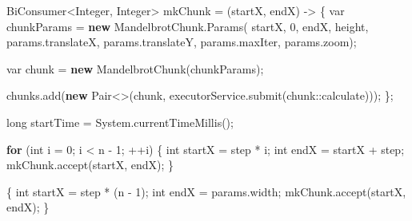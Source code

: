 \documentclass[11pt]{article}
\newenvironment{Shaded}{}{}
\newcommand{\KeywordTok}[1]{\textcolor[rgb]{0.00,0.44,0.13}{\textbf{{#1}}}}
\newcommand{\DataTypeTok}[1]{\textcolor[rgb]{0.56,0.13,0.00}{{#1}}}
\newcommand{\DecValTok}[1]{\textcolor[rgb]{0.25,0.63,0.44}{{#1}}}
\newcommand{\FunctionTok}[1]{\textcolor[rgb]{0.02,0.16,0.49}{{#1}}}
\newcommand{\NormalTok}[1]{{#1}}
\newcommand{\ControlFlowTok}[1]{\textcolor[rgb]{0.00,0.44,0.13}{\textbf{{#1}}}}
\newcommand{\OperatorTok}[1]{\textcolor[rgb]{0.40,0.40,0.40}{{#1}}}
\newcommand{\BuiltInTok}[1]{{#1}}
\begin{document}
\begin{Shaded}
\begin{Highlighting}[]
\NormalTok{        BiConsumer}\OperatorTok{\textless{}}\BuiltInTok{Integer}\OperatorTok{,} \BuiltInTok{Integer}\OperatorTok{\textgreater{}}\NormalTok{ mkChunk  }\OperatorTok{=} \OperatorTok{(}\NormalTok{startX}\OperatorTok{,}\NormalTok{ endX}\OperatorTok{)} \OperatorTok{{-}\textgreater{}} \OperatorTok{\{}
            \DataTypeTok{var}\NormalTok{ chunkParams }\OperatorTok{=} \KeywordTok{new}\NormalTok{ MandelbrotChunk}\OperatorTok{.}\FunctionTok{Params}\OperatorTok{(}
\NormalTok{                    startX}\OperatorTok{,} \DecValTok{0}\OperatorTok{,}
\NormalTok{                    endX}\OperatorTok{,}\NormalTok{ height}\OperatorTok{,}
\NormalTok{                    params}\OperatorTok{.}\FunctionTok{translateX}\OperatorTok{,}\NormalTok{ params}\OperatorTok{.}\FunctionTok{translateY}\OperatorTok{,}
\NormalTok{                    params}\OperatorTok{.}\FunctionTok{maxIter}\OperatorTok{,}\NormalTok{ params}\OperatorTok{.}\FunctionTok{zoom}\OperatorTok{);}

            \DataTypeTok{var}\NormalTok{ chunk }\OperatorTok{=} \KeywordTok{new} \FunctionTok{MandelbrotChunk}\OperatorTok{(}\NormalTok{chunkParams}\OperatorTok{);}

\NormalTok{            chunks}\OperatorTok{.}\FunctionTok{add}\OperatorTok{(}\KeywordTok{new}\NormalTok{ Pair}\OperatorTok{\textless{}\textgreater{}(}\NormalTok{chunk}\OperatorTok{,}\NormalTok{ executorService}\OperatorTok{.}\FunctionTok{submit}\OperatorTok{(}\NormalTok{chunk}\OperatorTok{::}\NormalTok{calculate}\OperatorTok{)));}
        \OperatorTok{\};}

        \DataTypeTok{long}\NormalTok{ startTime }\OperatorTok{=} \BuiltInTok{System}\OperatorTok{.}\FunctionTok{currentTimeMillis}\OperatorTok{();}

        \ControlFlowTok{for} \OperatorTok{(}\DataTypeTok{int}\NormalTok{ i }\OperatorTok{=} \DecValTok{0}\OperatorTok{;}\NormalTok{ i }\OperatorTok{\textless{}}\NormalTok{ n }\OperatorTok{{-}} \DecValTok{1}\OperatorTok{;} \OperatorTok{++}\NormalTok{i}\OperatorTok{)} \OperatorTok{\{}
            \DataTypeTok{int}\NormalTok{ startX }\OperatorTok{=}\NormalTok{ step }\OperatorTok{*}\NormalTok{ i}\OperatorTok{;}
            \DataTypeTok{int}\NormalTok{ endX }\OperatorTok{=}\NormalTok{ startX }\OperatorTok{+}\NormalTok{ step}\OperatorTok{;}
\NormalTok{            mkChunk}\OperatorTok{.}\FunctionTok{accept}\OperatorTok{(}\NormalTok{startX}\OperatorTok{,}\NormalTok{ endX}\OperatorTok{);}
        \OperatorTok{\}}

        \OperatorTok{\{}
            \DataTypeTok{int}\NormalTok{ startX }\OperatorTok{=}\NormalTok{ step }\OperatorTok{*} \OperatorTok{(}\NormalTok{n }\OperatorTok{{-}} \DecValTok{1}\OperatorTok{);}
            \DataTypeTok{int}\NormalTok{ endX }\OperatorTok{=}\NormalTok{ params}\OperatorTok{.}\FunctionTok{width}\OperatorTok{;}
\NormalTok{            mkChunk}\OperatorTok{.}\FunctionTok{accept}\OperatorTok{(}\NormalTok{startX}\OperatorTok{,}\NormalTok{ endX}\OperatorTok{);}
        \OperatorTok{\}}


\end{Highlighting}
\end{Shaded}
\end{document}
